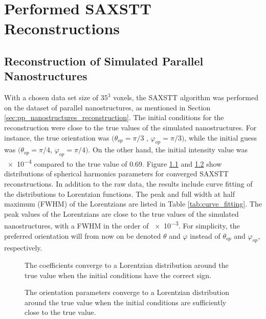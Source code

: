 \chapter{Performed SAXSTT Reconstructions}

\section{Reconstruction of Simulated Parallel Nanostructures}
\label{sec:reconstruction_parallel}

With a chosen data set size of $35^3$ voxels,
the SAXSTT algorithm was performed on the dataset of parallel nanostructures, as mentioned in Section \ref{sec:pp_nanostructures_reconstruction}.
The initial conditions for the reconstruction were close to the true values of the simulated nanostructures.
For instance, the true orientation was $(\theta_{op} = \pi/3$ , $\varphi_{op} = \pi/3)$, while the initial guess was $(\theta_{op} = \pi/4$, $\varphi_{op} = \pi/4)$.
On the other hand, the initial intensity value was \num{e-4} compared to the true value of 0.69.
Figure \ref{fig:coefficient_comparison_AD_SYM} and \ref{fig:orientation_comparison_AD_SYM} show distributions of spherical harmonics parameters for converged SAXSTT reconstructions.
In addition to the raw data, the results include curve fitting of the distributions to Lorentzian functions.
The peak and full width at half maximum (FWHM) of the Lorentzians are listed in Table \ref{tab:curve_fitting}.
The peak values of the Lorentzians are close to the true values of the simulated nanostructures, with a FWHM in the order of \num{e-3}.
For simplicity, the preferred orientation will from now on be denoted $\theta$ and $\varphi$ instead of $\theta_{op}$ and $\varphi_{op}$, respectively.

\begin{figure}[h!]
    \centering
    
    \caption{ The coefficients converge to a Lorentzian distribution
        around the true value when the initial conditions have the correct sign.  }
    \label{fig:coefficient_comparison_AD_SYM}
\end{figure}

\begin{figure}[h!]
    \centering
    
    \caption{  The orientation parameters converge to a Lorentzian distribution
        around the true value when the initial conditions are sufficiently close to the true value.}
    \label{fig:orientation_comparison_AD_SYM}
\end{figure}


